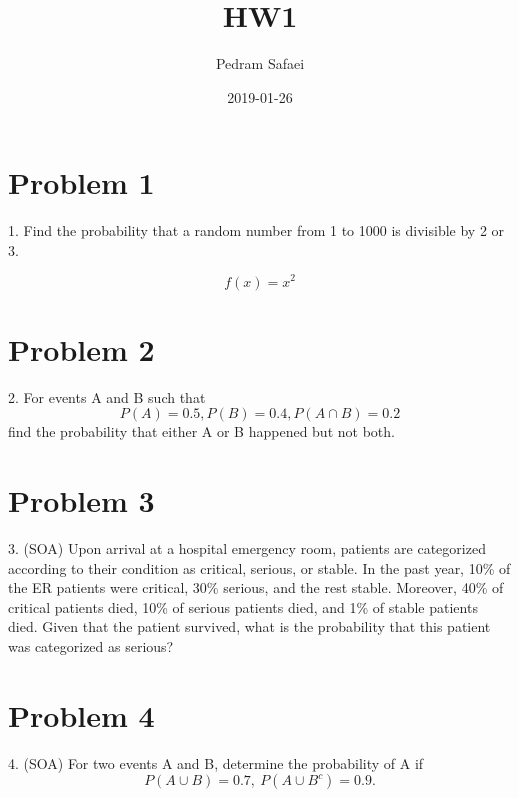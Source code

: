 \documentclass{article}
\title{HW1}
\date{2019-01-26}
\author{Pedram Safaei}
\begin{document}
	\maketitle
	\newpage
	
	\section*{Problem 1} 
	
	1. Find the probability that a random number from 1 to 1000 is divisible by 2 or 3.

	\begin{equation*}
		f(x) = x^2
	\end{equation*}
	
	\section*{Problem 2} 
	2. For events A and B such that 
	\begin{equation*}
	P ( A ) = 0.5 , P ( B ) = 0.4 , P ( A \cap B ) = 0.2 
	\end{equation*}
	find the probability that either A or B happened but not both.
	
	\section*{Problem 3} 
	3. (SOA) Upon arrival at a hospital emergency room, patients are categorized according to their condition as critical, serious, or stable. In the past year, 10\% of the ER patients were critical, 30\% serious, and the rest stable. Moreover, 40\% of critical patients died, 10\% of serious patients died, and 1\% of stable patients died. Given that the patient survived, what is the probability that this patient was categorized as serious?
	
	\section*{Problem 4} 
	4. (SOA) For two events A and B, determine the probability of A if 
	\begin{equation*}
     P(A\cup B) = 0.7,\ P(A\cup B^c) = 0.9.
	\end{equation*}
	
\end{document}
